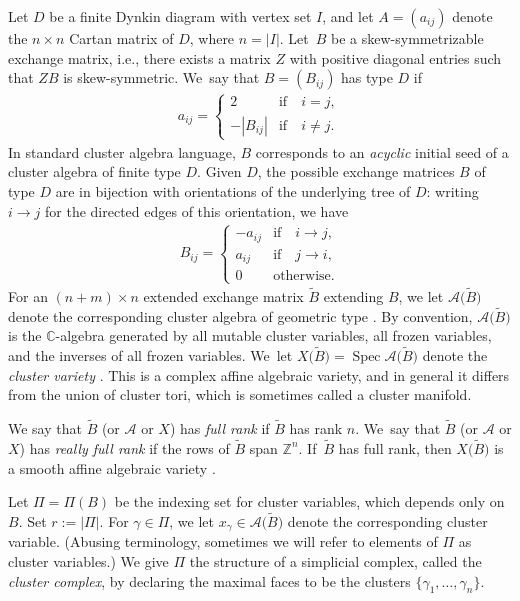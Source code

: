 \documentclass[10pt,a4paper]{amsart}
\def\C{{\mathbb C}}
\def\Z{{\mathbb Z}}
\def\A{{\mathcal{A}}}
\def\Spec{\operatorname{Spec}}
\def\tB{{\tilde B}}
\def\tB{{\tilde B}}
\numberwithin{equation}{section}
\begin{document}
\bigskip{}
Let $D$ be a finite Dynkin diagram with vertex set $I$, and let $A=(a_{ij})$ denote the $n \times n$ Cartan matrix of $D$, where $n = |I|$. Let~$B$ be a skew-symmetrizable exchange matrix, i.e., there exists a matrix $Z$ with positive diagonal entries such that $ZB$ is skew-symmetric. We~say that $B = (B_{ij})$ has type $D$ if
\begin{gather*}
a_{ij} = \begin{cases} 2 & \mbox{if}\quad i = j,
\\
-|B_{ij}| & \mbox{if}\quad i \neq j.
\end{cases}
\end{gather*}
In standard cluster algebra language, $B$ corresponds to an \emph{acyclic} initial seed of a cluster algebra of finite type $D$.
Given $D$, the possible exchange matrices $B$ of type $D$ are in bijection with orientations of the underlying tree of $D$: writing $i \to j$ for the directed edges of this orientation,
we have
\begin{gather*}
B_{ij} = \begin{cases} -a_{ij} & \mbox{if}\quad i \to j,
\\
a_{ij} & \mbox{if}\quad j \to i,
\\
0 & \mbox{otherwise.}
\end{cases}
\end{gather*}
For an $(n+m) \times n$ extended exchange matrix $\tilde B$ extending $B$, we let $\A\big(\tB\big)$ denote the correspon\-ding cluster algebra of geometric type \cite{CA2}. By convention, $\A\big(\tB\big)$ is the $\C$-algebra generated by all mutable cluster variables, all frozen variables, and the inverses of all frozen variables. We~let $X\big(\tB\big) = \Spec\A\big(\tB\big)$ denote the \emph{cluster variety} \cite{LS}. This is a complex affine algebraic variety, and in general it differs from the union of cluster tori, which is sometimes called a cluster manifold.

\bigskip{}
We say that $\tB$ (or $\A$ or $X$) has \emph{full rank} if $\tB$ has rank $n$. We~say that $\tB$ (or $\A$ or $X$) has \emph{really full rank} if the rows of $\tB$ span $\Z^n$. If~$\tB$ has full rank, then $X\big(\tB\big)$ is a smooth affine algebraic variety \cite[Theorem~7.7]{Mul}.

\bigskip{}
Let $\Pi = \Pi(B)$ be the indexing set for cluster variables, which depends only on $B$. Set $r:=|\Pi|$. For $\gamma \in \Pi$, we let $x_\gamma \in \A\big(\tB\big)$ denote the corresponding cluster variable. (Abusing terminology, sometimes we will refer to elements of $\Pi$ as cluster variables.) We give $\Pi$ the structure of a simplicial complex, called the \emph{cluster complex}, by declaring the maximal faces to be the clusters $\{\gamma_1,\dots,\gamma_n\}$.
\end{document}

